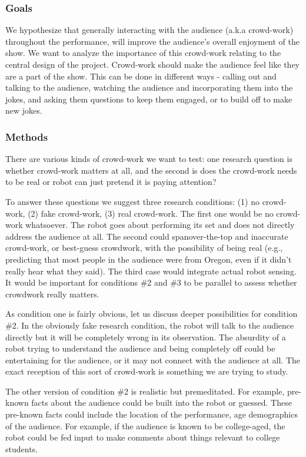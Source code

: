\documentclass[onecolumn, draftclsnofoot,10pt, compsoc]{IEEEtran}
\begin{document}
\subsubsection{Goals}

We hypothesize that generally interacting with the audience (a.k.a crowd-work) throughout the performance, will improve the audience's overall enjoyment of the show. We want to analyze the importance of this crowd-work relating to the central design of the project.
Crowd-work should make the audience feel like they are a part of the show. This can be done in different ways - calling out and talking to the audience, watching the audience and incorporating them into the jokes, and asking them questions to keep them engaged, or to build off to make new jokes.

\subsubsection{Methods}
There are various kinds of crowd-work we want to test: one research question is whether crowd-work matters at all, and the second is does the crowd-work needs to be real or robot can just pretend it is paying attention?

To answer these questions we suggest three research conditions: (1) no crowd-work, (2) fake crowd-work, (3) real crowd-work. The first one would be no crowd-work whatsoever. The robot goes about performing its set and does not directly address the audience at all. The second could spanover-the-top and inaccurate crowd-work, or best-guess crowdwork, with the possibility of being real (e.g., predicting that most people in the audience were from Oregon, even if it didn't really hear what they said). The third case would integrate actual robot sensing. It would be important for conditions \#2 and \#3 to be parallel to assess whether crowdwork really matters.

As condition one is fairly obvious, let us discuss deeper possibilities for condition \#2. In the obviously fake research condition, the robot will talk to the audience directly but it will be completely wrong in its observation. The absurdity of a robot trying to understand the audience and being completely off could be entertaining for the audience, or it may not connect with the audience at all. The exact reception of this sort of crowd-work is something we are trying to study.

The other version of condition \#2 is realistic but premeditated. For example, pre-known facts about the audience could be built into the robot or guessed. These pre-known facts could include the location of the performance, age demographics of the audience. For example, if the audience is known to be college-aged, the robot could be fed input to make comments about things relevant to college students.
\end{document}
